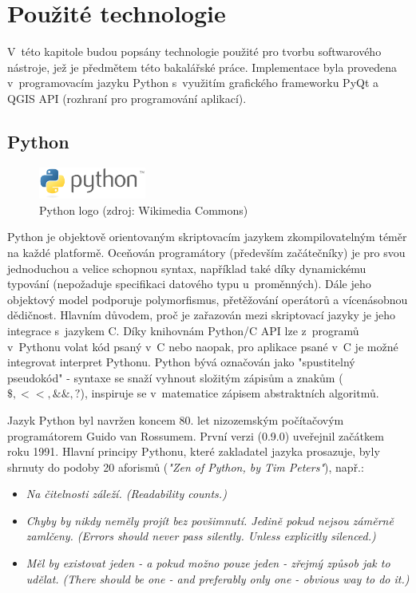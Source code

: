 \chapter{Použité technologie}
\label{3-technologie}

V~této kapitole budou popsány technologie použité pro tvorbu softwarového nástroje, jež je předmětem této bakalářské práce. Implementace byla provedena v~programovacím jazyku Python s~využitím grafického frameworku PyQt a QGIS API (rozhraní pro programování aplikací).  

\section{Python}
\begin{figure}[H]
    \centering
      \includegraphics[width=100pt]{./pictures/python.png}
      \caption[Python logo]{Python logo (zdroj: Wikimedia Commons)}
      \label{fig:python}
\end{figure}
  
Python je objektově orientovaným skriptovacím jazykem zkompilovatelným téměr na každé platformě. Oceňován programátory (především začátečníky) je pro svou jednoduchou a velice schopnou syntax, například také díky dynamickému typování (nepožaduje specifikaci datového typu u~proměnných). Dále jeho objektový model podporuje polymorfismus, přetěžování operátorů a vícenásobnou dědičnost. Hlavním důvodem, proč je zařazován mezi skriptovací jazyky je jeho integrace s~jazykem C. Díky knihovnám Python/C API lze z~programů v~Pythonu volat kód psaný v~C nebo naopak, pro aplikace psané v~C je možné integrovat interpret Pythonu. 
Python bývá označován jako "spustitelný pseudokód" - syntaxe se snaží vyhnout složitým zápisům a znakům ($\$, <<, \&\&, ?$), inspiruje se v~matematice zápisem abstraktních algoritmů.\cite{learningPython}

Jazyk Python byl navržen koncem 80. let nizozemským počítačovým programátorem Guido van Rossumem. První verzi (0.9.0) uveřejnil začátkem roku 1991. Hlavní principy Pythonu, které zakladatel jazyka prosazuje, byly shrnuty do podoby 20 aforismů (\textit{"Zen of Python, by Tim Peters"}), např.:

\begin{itemize}

	\item
		\textit{Na čitelnosti záleží. (Readability counts.)} 	
			
	\item
		\textit{Chyby by nikdy neměly projít bez povšimnutí. Jedině pokud nejsou záměrně zamlčeny. (Errors should never pass silently. Unless explicitly silenced.)}
		
	\item
		\textit{Měl by existovat jeden - a pokud možno pouze jeden - zřejmý způsob jak to udělat. (There should be one - and preferably only one - obvious way to do it.)}
\end{itemize}  

